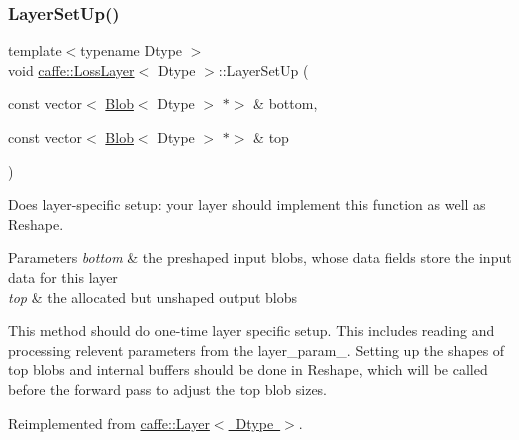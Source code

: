 \subsubsection{\texorpdfstring{Layer\+Set\+Up()}{LayerSetUp()}\hspace{0.1cm}{\footnotesize\ttfamily [2/2]}}
{\footnotesize\ttfamily template$<$typename Dtype $>$ \\
void \mbox{\hyperlink{classcaffe_1_1_loss_layer}{caffe\+::\+Loss\+Layer}}$<$ Dtype $>$\+::Layer\+Set\+Up (\begin{DoxyParamCaption}\item[{const vector$<$ \mbox{\hyperlink{classcaffe_1_1_blob}{Blob}}$<$ Dtype $>$ $\ast$$>$ \&}]{bottom,  }\item[{const vector$<$ \mbox{\hyperlink{classcaffe_1_1_blob}{Blob}}$<$ Dtype $>$ $\ast$$>$ \&}]{top }\end{DoxyParamCaption})\hspace{0.3cm}{\ttfamily [virtual]}}



Does layer-\/specific setup\+: your layer should implement this function as well as Reshape. 


\begin{DoxyParams}{Parameters}
{\em bottom} & the preshaped input blobs, whose data fields store the input data for this layer \\
\hline
{\em top} & the allocated but unshaped output blobs\\
\hline
\end{DoxyParams}
This method should do one-\/time layer specific setup. This includes reading and processing relevent parameters from the {\ttfamily layer\+\_\+param\+\_\+}. Setting up the shapes of top blobs and internal buffers should be done in {\ttfamily Reshape}, which will be called before the forward pass to adjust the top blob sizes. 

Reimplemented from \mbox{\hyperlink{classcaffe_1_1_layer_a481323a3e0972c682787f2137468c29f}{caffe\+::\+Layer$<$ Dtype $>$}}.



